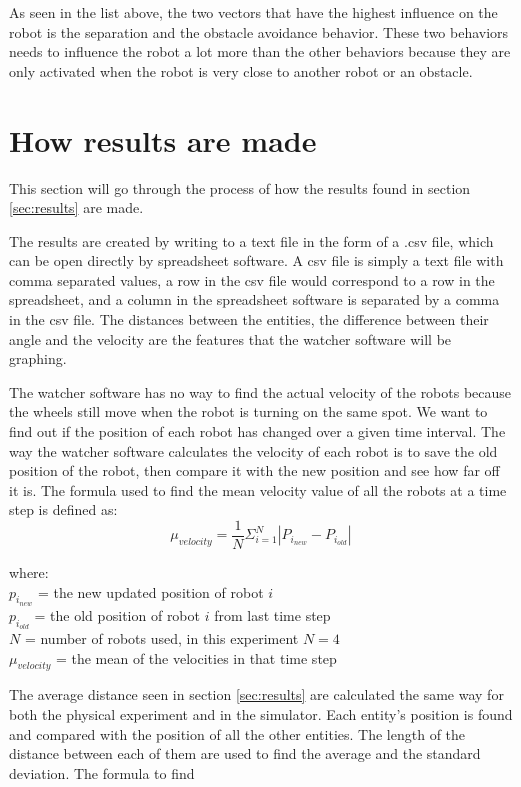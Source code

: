 As seen in the list above, the two vectors that have the highest influence on the robot is the separation and the obstacle avoidance behavior. These two behaviors needs to influence the robot a lot more than the other behaviors because they are only activated when the robot is very close to another robot or an obstacle.

\section{How results are made}
This section will go through the process of how the results found in section \ref{sec:results} are made.

The results are created by writing to a text file in the form of a .csv file, which can be open directly by spreadsheet software. A csv file is simply a text file with comma separated values, a row in the csv file would correspond to a row in the spreadsheet, and a column in the spreadsheet software is separated by a comma in the csv file. The distances between the entities, the difference between their angle and the velocity are the features that the watcher software will be graphing.

The watcher software has no way to find the actual velocity of the robots because the wheels still move when the robot is turning on the same spot. We want to find out if the position of each robot has changed over a given time interval.
The way the watcher software calculates the velocity of each robot is to save the old position of the robot, then compare it with the new position and see how far off it is.
The formula used to find the mean velocity value of all the robots at a time step is defined as:
\begin{equation}
\label{eq:muvel}
\mu_{velocity} = \frac{1}{N} \Sigma_{i=1}^N |P_{i_{new}} - P_{i_{old}}|
\end{equation}

where:
\\
$p_{i_{new}}$ = the new updated position of robot $i$
\\
$p_{i_{old}}$ = the old position of robot $i$ from last time step
\\
$N$ = number of robots used, in this experiment $N = 4$ 
\\
$\mu_{velocity}$ = the mean of the velocities in that time step

The average distance seen in section \ref{sec:results} are calculated the same way for both the physical experiment and in the simulator. Each entity's position is found and compared with the position of all the other entities. The length of the distance between each of them are used to find the average and the standard deviation.
The formula to find 

